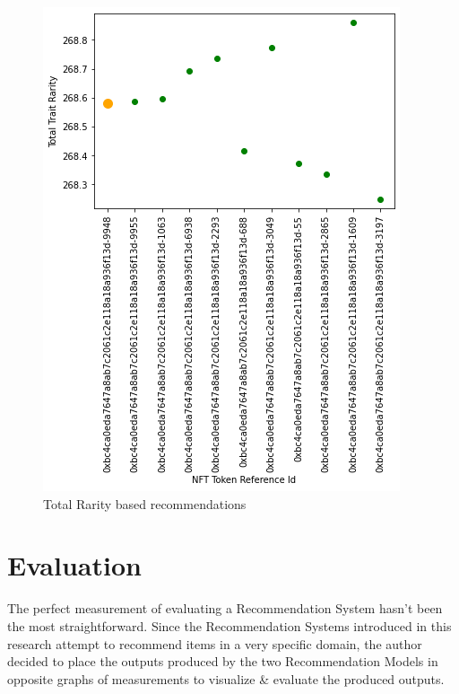 \documentclass[conference]{IEEEtran}
\begin{document}
\begin{figure}[htbp]
\centerline{\includegraphics[width=\linewidth]{images/Trait rarity representation graph - rarity recommendations.png}}
\caption{Total Rarity based recommendations}
\label{fig:total-rarity-output}
\end{figure}

\section{Evaluation}
The perfect measurement of evaluating a Recommendation System hasn't been the most straightforward. Since the Recommendation Systems introduced in this research attempt to recommend items in a very specific domain, the author decided to place the outputs produced by the two Recommendation Models in opposite graphs of measurements to visualize \& evaluate the produced outputs.
\end{document}
